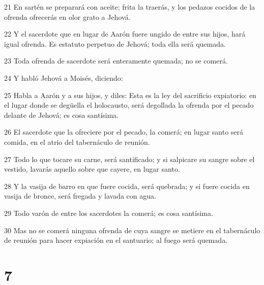 \par 21 En sartén se preparará con aceite; frita la traerás, y los pedazos cocidos de la ofrenda ofrecerás en olor grato a Jehová.
\par 22 Y el sacerdote que en lugar de Aarón fuere ungido de entre sus hijos, hará igual ofrenda. Es estatuto perpetuo de Jehová; toda ella será quemada.
\par 23 Toda ofrenda de sacerdote será enteramente quemada; no se comerá.
\par 24 Y habló Jehová a Moisés, diciendo:
\par 25 Habla a Aarón y a sus hijos, y diles: Esta es la ley del sacrificio expiatorio: en el lugar donde se degüella el holocausto, será degollada la ofrenda por el pecado delante de Jehová; es cosa santísima.
\par 26 El sacerdote que la ofreciere por el pecado, la comerá; en lugar santo será comida, en el atrio del tabernáculo de reunión.
\par 27 Todo lo que tocare su carne, será santificado; y si salpicare su sangre sobre el vestido, lavarás aquello sobre que cayere, en lugar santo.
\par 28 Y la vasija de barro en que fuere cocida, será quebrada; y si fuere cocida en vasija de bronce, será fregada y lavada con agua.
\par 29 Todo varón de entre los sacerdotes la comerá; es cosa santísima.
\par 30 Mas no se comerá ninguna ofrenda de cuya sangre se metiere en el tabernáculo de reunión para hacer expiación en el santuario; al fuego será quemada.

\chapter{7}

